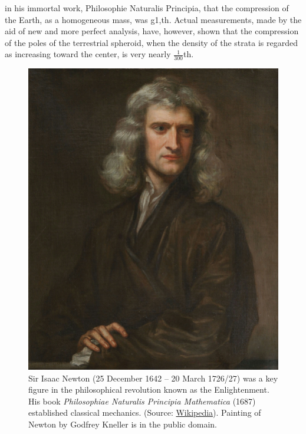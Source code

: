 in his immortal work, Philosophie Naturalis Principia, that the compression of the Earth, as a homogeneous mass, was g1,th. Actual measurements, made by the aid of new and more perfect analysis, have, however, shown that the compression of the poles of the terrestrial spheroid, when the density of the strata is regarded as increasing toward the center, is very nearly $\frac{1}{300}$th.

\clearpage
\begin{figure}
    \includegraphics[width=.4\textwidth]{../../pictures/Portrait_of_Sir_Isaac_Newton,_1689.jpg}
    \caption{\footnotesize Sir Isaac Newton (25 December 1642 -- 20 March 1726/27) was a key figure in the philosophical revolution known as the Enlightenment. His book \emph{Philosophiae Naturalis Principia Mathematica} (1687) established classical mechanics. (Source: \href{https://en.wikipedia.org/wiki/Isaac_Newton}{Wikipedia}). Painting of Newton by Godfrey Kneller is in the public domain.}
    \vspace{-.5cm}
 \end{figure}

